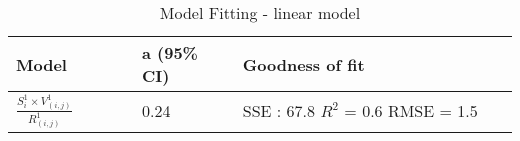 \documentclass[10pt]{article}
\begin{document}
\begin{center}
\begin{table}[htbp]
\caption{Model Fitting - linear model}
\begin{center}
\begin{adjustbox}{width=0.5\textwidth} 
\begin{tabular}{|p{0.25\linewidth}|p{0.2\linewidth}|p{0.55\linewidth}|} 
\hline
Model & a (95\% CI) & Goodness of fit\\
\hline
$\frac{S_{i}^1 \times V_{(i,j)}^1}{R_{(i,j)}^1}$  & 0.24 & SSE : 67.8  $R^2$ = 0.6 RMSE = 1.5 \\
\hline
\end{tabular}
\end{adjustbox}
\end{center}
\end{table}
\end{center} 
\end{document}
